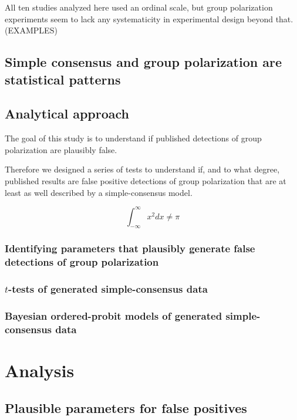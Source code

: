 \documentclass[11pt, letterpaper]{article}
\begin{document}
All ten studies analyzed here used an ordinal scale, but group polarization experiments seem to
lack any systematicity in experimental design beyond that. (EXAMPLES)

\subsection{Simple consensus and group polarization are statistical patterns}

\subsection{Analytical approach}

The goal of this study is to understand if published detections of group polarization are
plausibly false. 

Therefore we designed a series of tests to understand if, and to what degree,
published results are false positive detections of group polarization that
are at least as well described by a simple-consensus model.


\begin{equation}
  \int_{-\infty}^\infty x^2 dx \neq \pi
\end{equation}
\noindent

\subsubsection{Identifying parameters that plausibly generate false detections of group polarization}

\subsubsection{$t$-tests of generated simple-consensus data}

\subsubsection{Bayesian ordered-probit models of generated simple-consensus data}

\section{Analysis}

\subsection{Plausible parameters for false positives}
\end{document}
